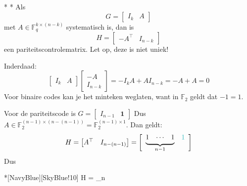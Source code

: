 \begin{nicecorollary}*
    \nextpart[]*
    Als
    \begin{equation*}
        G = \begin{bmatrix}
            I_k & A
        \end{bmatrix}
    \end{equation*}
    met $A \in \mathbb{F}_q^{k \times (n-k)}$ systematisch is, dan is
    \begin{equation*}
        H = \begin{bmatrix}
            -A^\top & I_{n-k}
        \end{bmatrix}
    \end{equation*}
    een pariteitscontrolematrix. Let op, deze is niet uniek!
\end{nicecorollary}
Inderdaad:
\begin{equation*}
    \begin{bmatrix}
        I_k & A
    \end{bmatrix}\begin{bmatrix}
        -A \\ I_{n-k}
    \end{bmatrix} = -I_kA + AI_{n-k} = -A + A = 0
\end{equation*}
Voor binaire codes kan je het minteken weglaten, want in $\mathbb{F}_2$ geldt dat $-1=1$.


Voor de pariteitscode is $G = \begin{bmatrix}
    I_{n-1} & \mathbf{1}
\end{bmatrix}$
Dus $A \in \mathbb{F}_2^{(n-1) \times (n - (n-1))} = \mathbb{F}_2^{(n-1) \times 1}$. Dan geldt:
\begin{equation*}
    H = \begin{bmatrix}
        A^\top & I_{n-(n-1)}
    \end{bmatrix} = \left[
    \begin{array}{cccc}
        \multicolumn{3}{c}{
            \underbrace{\begin{matrix}1 & \cdots & 1\end{matrix}}_{n-1}
        }
        & \textcolor{Aquamarine}{1}
    \end{array}
    \right]
\end{equation*}
Dus
\begin{equationbox}*[NavyBlue][SkyBlue!10]
    H = _{n}
\end{equationbox}

